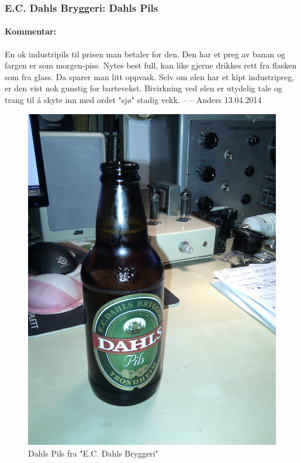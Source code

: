 \documentclass[12pt,a4paper,oneside,norsk]{article}
\begin{document}
\newpage
\subsubsection{E.C. Dahls Bryggeri: Dahls Pils}
\paragraph{Kommentar:}En ok industripils til prisen man betaler for den. Den har et preg av banan og fargen er som morgen-piss. Nytes best full, kan like gjerne drikkes rett fra flasken som fra glass. Da sparer man litt oppvask. Selv om ølen har et kipt industripreg, er den vist nok gunstig for bartevekst. Bivirkning ved ølen er utydelig tale og trang til å skyte inn med ordet "sjø" stadig vekk.
\newline
-- -- Anders 13.04.2014

\begin{figure} [H]
\centering
\includegraphics[scale=0.1, angle=0]{Bilder/Ol/dahls.jpg}
\caption{Dahls Pils fra "E.C. Dahls Bryggeri"}
\end{figure}
\end{document}
